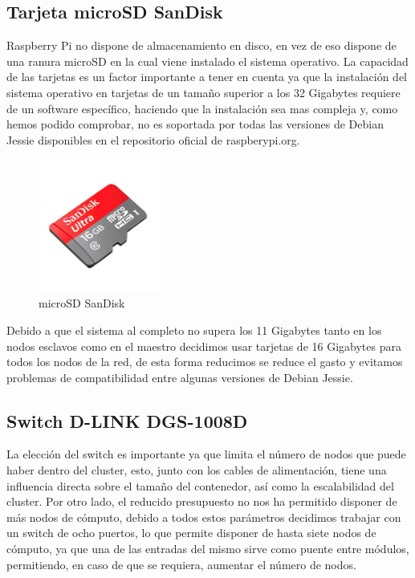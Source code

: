 \subsection{Tarjeta microSD SanDisk}

Raspberry Pi no dispone de almacenamiento en disco, en vez de eso dispone de una ranura microSD en la cual viene instalado el sistema operativo. La capacidad de las tarjetas es un factor importante a tener en cuenta ya que la instalación del sistema operativo en tarjetas de un tamaño superior a los 32 Gigabytes requiere de un software específico, haciendo que la instalación sea mas compleja y, como hemos podido comprobar, no es soportada por todas las versiones de Debian Jessie disponibles en el repositorio oficial de raspberypi.org.

\begin{figure}[H]
	\centering
  	\includegraphics[width=40mm]{pics/sd.jpg}
   	\caption[microSD SanDisk]{microSD SanDisk}
   \label{figure2.2}
\end{figure}

Debido a que el sistema al completo no supera los 11 Gigabytes tanto en los nodos esclavos como en el maestro decidimos usar tarjetas de 16 Gigabytes para todos los nodos de la red, de esta forma reducimos se reduce el gasto y evitamos problemas de compatibilidad entre algunas versiones de Debian Jessie.

\subsection{Switch D-LINK DGS-1008D}

La elección del switch es importante ya que limita el número de nodos que puede haber dentro del cluster, esto, junto con los  cables de alimentación, tiene una influencia directa sobre el tamaño del contenedor, así como la escalabilidad del cluster. Por otro lado, el reducido presupuesto no nos ha permitido disponer de más nodos de cómputo, debido a todos estos parámetros decidimos trabajar con un switch de ocho puertos, lo que permite disponer de hasta siete nodos de cómputo, ya que una de las entradas del mismo sirve como puente entre módulos, permitiendo, en caso de que se requiera, aumentar el número de nodos.


